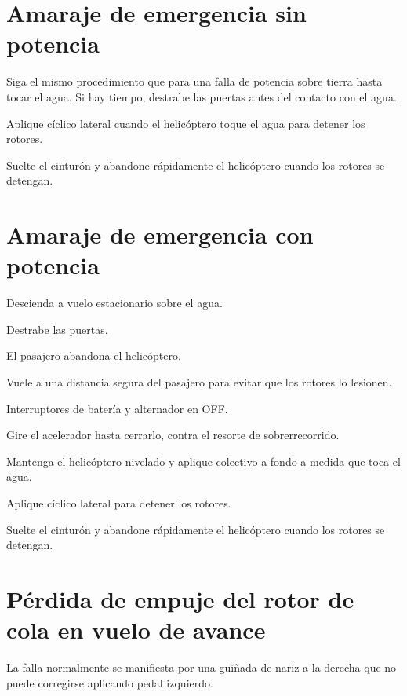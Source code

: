 \section{Amaraje de emergencia sin potencia}

\begin{pasos}
\item Siga el mismo procedimiento que para una falla de potencia sobre tierra hasta tocar el agua. Si hay tiempo, destrabe las puertas antes del contacto con el agua.
\item Aplique cíclico lateral cuando el helicóptero toque el agua para detener los rotores.
\item Suelte el cinturón y abandone rápidamente el helicóptero cuando los rotores se detengan.
\end{pasos}

\section{Amaraje de emergencia con potencia}

\begin{pasos}
\item Descienda a vuelo estacionario sobre el agua.
\item Destrabe las puertas.
\item El pasajero abandona el helicóptero.
\item Vuele a una distancia segura del pasajero para evitar que los rotores lo lesionen.
\item Interruptores de batería y alternador en OFF.
\item Gire el acelerador hasta cerrarlo, contra el resorte de sobrerrecorrido.
\item Mantenga el helicóptero nivelado y aplique colectivo a fondo a medida que toca el agua.
\item Aplique cíclico lateral para detener los rotores.
\item Suelte el cinturón y abandone rápidamente el helicóptero cuando los rotores se detengan.
\end{pasos}

\section{Pérdida de empuje del rotor de cola en vuelo de avance}

La falla normalmente se manifiesta por una guiñada de nariz a la derecha que no puede corregirse aplicando pedal izquierdo.

